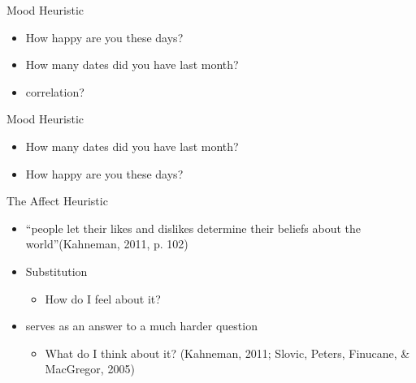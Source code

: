 \documentclass[
  ignorenonframetext,
]{beamer}
\providecommand{\tightlist}{%
  \setlength{\itemsep}{0pt}\setlength{\parskip}{0pt}}\usepackage{longtable,booktabs,array}
\begin{document}
\begin{frame}{Mood Heuristic}
\protect\hypertarget{mood-heuristic}{}
\begin{itemize}
\item
  How happy are you these days?
\item
  How many dates did you have last month?
\item
  correlation?
\end{itemize}
\end{frame}

\begin{frame}{Mood Heuristic}
\protect\hypertarget{mood-heuristic-1}{}
\begin{itemize}
\tightlist
\item
  How many dates did you have last month?
\item
  How happy are you these days?
\end{itemize}
\end{frame}

\begin{frame}{The Affect Heuristic}
\protect\hypertarget{the-affect-heuristic}{}
\begin{itemize}
\item
  ``people let their likes and dislikes determine their beliefs about
  the world''(Kahneman, 2011, p. 102)
\item
  Substitution

  \begin{itemize}
  \tightlist
  \item
    How do I feel about it?
  \end{itemize}
\item
  serves as an answer to a much harder question

  \begin{itemize}
  \tightlist
  \item
    What do I think about it? (Kahneman, 2011; Slovic, Peters, Finucane,
    \& MacGregor, 2005)
  \end{itemize}
\end{itemize}
\end{frame}
\end{document}
